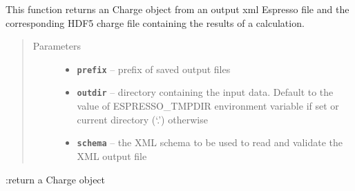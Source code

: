 \documentclass[letterpaper,10pt,english]{sphinxmanual}
\begin{document}
\begin{fulllineitems}
\label{postqe:postqe.api.get_charge}
This function returns an Charge object from an output xml Espresso file and the
corresponding HDF5 charge file containing the results of a calculation.
\begin{quote}\begin{description}
\item[{Parameters}] \leavevmode\begin{itemize}
\item {} 
\textbf{\texttt{prefix}} -- prefix of saved output files

\item {} 
\textbf{\texttt{outdir}} -- directory containing the input data. Default to the value of     ESPRESSO\_TMPDIR environment variable if set or current directory (`.') otherwise

\item {} 
\textbf{\texttt{schema}} -- the XML schema to be used to read and validate the XML output file

\end{itemize}

\end{description}\end{quote}

:return a Charge object

\end{fulllineitems}

\end{document}
